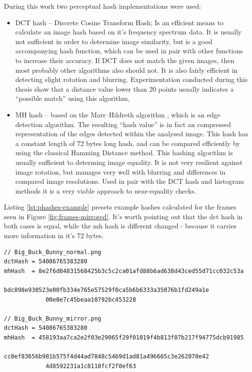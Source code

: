During this work two perceptual hash implementations were used:
\begin{itemize}
  \item DCT hash -- Discrete Cosine Transform Hash; Is an efficient means to calculate an image hash based on it's
                    frequency spectrum data. It is usually not sufficient in order to determine image similarity, 
                    but is a good accompanying hash function, which can be used in pair with other functions to increase 
                    their accuracy. If DCT does not match the given images, then most probably other algorithms also 
                    should not. It is also fairly efficient in detecting slight rotation and blurring. Experimentation 
                    conducted during this thesis show that a distance value lower than 20 points usually indicates a 
                    ``possible match'' using this algorithm,
                    
  \item MH hash -- based on the Marr--Hildreth algorithm \cite{marr-hildreth}, which is an edge detection algorithm.
                   The resulting ``hash value'' is in fact an compressed representation of the edges detected within the
                   analysed image. This hash has a constant length of 72 bytes long hash, and can be compared efficiently 
                   by using the classical Hamming Distance \cite{hamming-distance} method. This hashing algorithm is
                   usually sufficient to determing image equality. It is not very resilient against image rotation, but 
                   manages very well with blurring and differences in compared image resolutions. Used in pair with the 
                   DCT hash and histogram methods it is a very viable approach to near-equality checks.
\end{itemize}

Listing \ref{lst:phashes-example} presets example hashes calculated for the frames seen in Figure \ref{fig:frames-mirrored}. It's worth pointing out that the dct hash in both cases is equal, while the mh hash is different changed - because it carries more information in it's 72 bytes.

\begin{lstlisting}[caption={Example hashes, calculated for a original and mirrored frame}, label={lst:phashes-example}]
// Big_Buck_Bunny_normal.png
dctHash = 54086765383280
mhHash  = 8e2f6d04831568425b3c5c2ca01afd88b6ad638d43ced55d71cc032c53a
            bdc898e930523e00fb334e765e57529f0ca5b6b6333a35076b1fd249a1e
            00e0e7c45beaa10792bc453228
                        
// Big_Buck_Bunny_mirror.png
dctHash = 54086765383280
mhHash  = 458193aa7ca2e2f03e29065f29f01019f4b813f07b217f94775dcb91985
            cc0ef83656b981b575f4d44ad7848c5469d1ad81a496665c3e262070e42
            4d8592231a1c8118fcf2f0ef63
\end{lstlisting}

